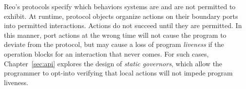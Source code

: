 Reo's protocols specify which behaviors systems are and are not permitted to exhibit. At runtime, protocol objects organize actions on their boundary ports into permitted interactions. Actions do not succeed until they are permitted. In this manner, port actions at the wrong time will not cause the program to deviate from the protocol, but may cause a loss of program \textit{liveness} if the operation blocks for an interaction that never comes. For such cases, Chapter~\ref{sec:api} explores the design of \textit{static governors}, which allow the programmer to opt-into verifying that local actions will not impede program liveness.

